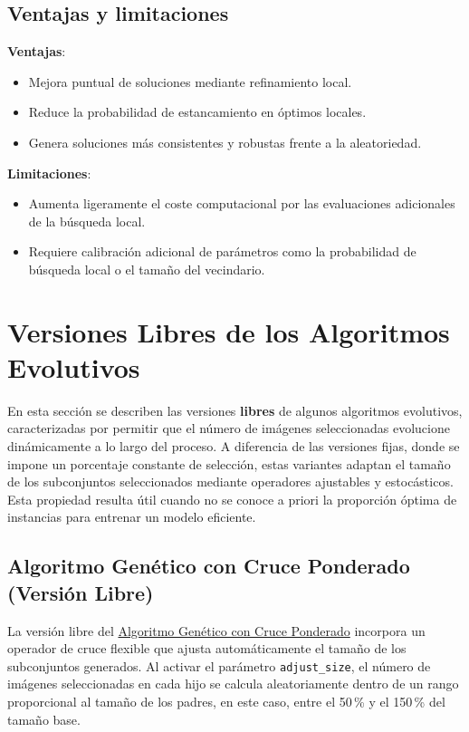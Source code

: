\subsection{Ventajas y limitaciones}\label{subsec:ventajas-y-limitaciones-memetico}
\textbf{Ventajas}:
\begin{itemize}
      \item Mejora puntual de soluciones mediante refinamiento local.
      \item Reduce la probabilidad de estancamiento en óptimos locales.
      \item Genera soluciones más consistentes y robustas frente a la aleatoriedad.
\end{itemize}

\textbf{Limitaciones}:
\begin{itemize}
      \item Aumenta ligeramente el coste computacional por las evaluaciones adicionales de la búsqueda local.
      \item Requiere calibración adicional de parámetros como la probabilidad de búsqueda local o el tamaño del vecindario.
\end{itemize}

\section{Versiones Libres de los Algoritmos Evolutivos}\label{sec:versiones-libres}
En esta sección se describen las versiones \textbf{libres} de algunos algoritmos evolutivos,
caracterizadas por permitir que el número de imágenes seleccionadas evolucione dinámicamente a lo largo del proceso.
A diferencia de las versiones fijas, donde se impone un porcentaje constante de selección,
estas variantes adaptan el tamaño de los subconjuntos seleccionados mediante operadores ajustables y estocásticos.
Esta propiedad resulta útil cuando no se conoce a priori la proporción óptima de instancias para entrenar un modelo eficiente.

\subsection{Algoritmo Genético con Cruce Ponderado (Versión Libre)}\label{subsec:genetico-v2-libre}

La versión libre del \hyperref[sec:genetico-v2]{Algoritmo Genético con Cruce Ponderado} incorpora un operador de
cruce flexible que ajusta automáticamente el tamaño de los subconjuntos generados.
Al activar el parámetro \texttt{adjust\_size}, el número de imágenes seleccionadas en cada hijo se calcula aleatoriamente
dentro de un rango proporcional al tamaño de los padres, en este caso, entre el 50\,\% y el 150\,\% del tamaño base.

